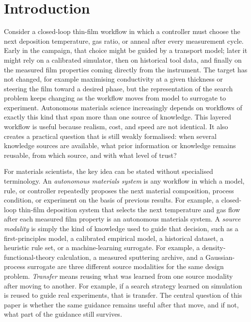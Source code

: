 \documentclass[twoside,twocolumn,9pt]{article}
\begin{document}

\section{Introduction}

Consider a closed-loop thin-film workflow in which a controller must choose the next deposition temperature, gas ratio, or anneal after every measurement cycle. Early in the campaign, that choice might be guided by a transport model; later it might rely on a calibrated simulator, then on historical tool data, and finally on the measured film properties coming directly from the instrument. The target has not changed, for example maximising conductivity at a given thickness or steering the film toward a desired phase, but the representation of the search problem keeps changing as the workflow moves from model to surrogate to experiment. Autonomous materials science increasingly depends on workflows of exactly this kind that span more than one source of knowledge.\cite{Jain2013MaterialsProject,Kirklin2015OQMD,Dunn2020Matbench,Yoshida2025NetworkedAutonomous,Gongora2021SimulationTransfer} This layered workflow is useful because realism, cost, and speed are not identical. It also creates a practical question that is still weakly formalised: when several knowledge sources are available, what prior information or knowledge remains reusable, from which source, and with what level of trust?

For materials scientists, the key idea can be stated without specialised terminology. An \emph{autonomous materials system} is any workflow in which a model, rule, or controller repeatedly proposes the next material composition, process condition, or experiment on the basis of previous results. For example, a closed-loop thin-film deposition system that selects the next temperature and gas flow after each measured film property is an autonomous materials system. A \emph{source modality} is simply the kind of knowledge used to guide that decision, such as a first-principles model, a calibrated empirical model, a historical dataset, a heuristic rule set, or a machine-learning surrogate. For example, a density-functional-theory calculation, a measured sputtering archive, and a Gaussian-process surrogate are three different source modalities for the same design problem. \emph{Transfer} means reusing what was learned from one source modality after moving to another. For example, if a search strategy learned on simulation is reused to guide real experiments, that is transfer. The central question of this paper is whether the same guidance remains useful after that move, and if not, what part of the guidance still survives.
\end{document}

